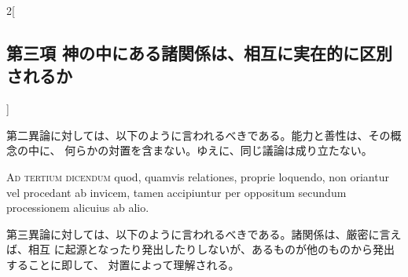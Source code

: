 \documentclass[paper=a4paper,fontsize=10pt,jafontsize=9pt,titlepage]{jlreq}
\begin{document}
\begin{paracol}{2}[\subsection{第三項 神の中にある諸関係は、相互に実在的に区別されるか}]
\switchcolumn


第二異論に対しては、以下のように言われるべきである。能力と善性は、その概念の中に、
何らかの対置を含まない。ゆえに、同じ議論は成り立たない。


\switchcolumn*[\subsection{ad.3}]


{\scshape Ad tertium dicendum} quod, quamvis relationes, proprie loquendo, non
oriantur vel procedant ab invicem, tamen accipiuntur per oppositum secundum
processionem alicuius ab alio.


\switchcolumn


第三異論に対しては、以下のように言われるべきである。諸関係は、厳密に言えば、相互
に起源となったり発出したりしないが、あるものが他のものから発出することに即して、
対置によって理解される。


\switchcolumn*



\end{paracol}
\newpage



\end{document}
